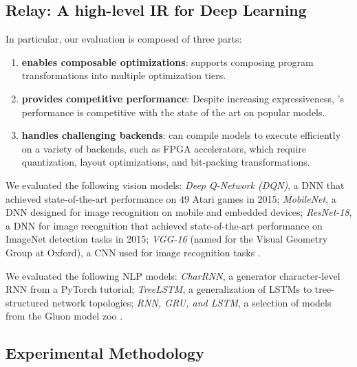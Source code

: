 \subsection{Relay: A high-level IR for Deep Learning}
  In particular, our evaluation is composed of three parts:
  \begin{enumerate}
    \item \textbf{\relay enables composable optimizations}: \relay
      supports composing program transformations into multiple optimization tiers.
    \item \textbf{\relay provides competitive performance}: Despite increasing
      expressiveness, \relay's performance is competitive with the
      state of the art on popular models.
    \item \textbf{\relay handles challenging backends}: \relay can compile
      models to execute efficiently on a variety of
      backends, such as FPGA accelerators, which require quantization, layout
      optimizations, and bit-packing transformations.
  \end{enumerate}

  We evaluated the following vision models:
    \textit{Deep Q-Network (DQN)}, a DNN that achieved state-of-the-art performance
    on 49 Atari games in 2015;
    \textit{MobileNet}, a DNN designed for image recognition on mobile and
    embedded devices;
    \textit{ResNet-18}, a DNN for image recognition that achieved state-of-the-art
    performance on ImageNet detection tasks in 2015;
    \textit{VGG-16} (named for the Visual Geometry Group
    at Oxford), a CNN used for image recognition tasks
    \citep{dqn, mobilenet, resnet, vgg}.

  We evaluated the following NLP models:
    \textit{CharRNN}, a generator character-level
    RNN from a PyTorch tutorial;
    \textit{TreeLSTM}, a generalization of LSTMs to
    tree-structured network topologies;
    \textit{RNN, GRU, and LSTM}, a selection of models from the Gluon
    model zoo
    \citep{pytorch_rnn_tut, tree_lstm, gluon_model_zoo}.

  \subsection{Experimental Methodology}

